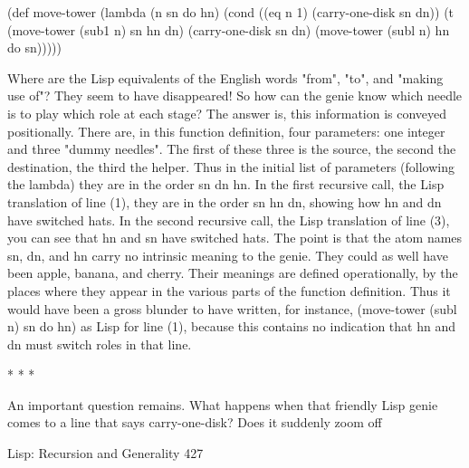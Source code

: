 (def move-tower (lambda (n sn do hn)
      (cond ((eq n 1) (carry-one-disk sn dn))
             (t (move-tower (sub1 n) sn hn dn)
                    (carry-one-disk sn dn)
                    (move-tower (subl n) hn do sn)))))

        Where are the Lisp equivalents of the English words "from", "to", and
"making use of"? They seem to have disappeared! So how can the genie know which
needle is to play which role at each stage? The answer is, this information is conveyed
positionally. There are, in this function definition, four parameters: one integer and
three "dummy needles". The first of these three is the source, the second the
destination, the third the helper. Thus in the initial list of parameters (following the
lambda) they are in the order sn dn hn. In the first recursive call, the Lisp translation
of line (1), they are in the order sn hn dn, showing how hn and dn have switched
hats. In the second recursive call, the Lisp translation of line (3), you can see that hn
and sn have switched hats.
        The point is that the atom names sn, dn, and hn carry no intrinsic meaning to
the genie. They could as well have been apple, banana, and cherry. Their meanings
are defined operationally, by the places where they appear in the various parts of the
function definition. Thus it would have been a gross blunder to have written, for
instance, (move-tower (subl n) sn do hn) as Lisp for line (1), because this contains
no indication that hn and dn must switch roles in that line.

                                       *   *   *

An important question remains. What happens when that friendly Lisp genie comes to
a line that says carry-one-disk? Does it suddenly zoom off




Lisp: Recursion and Generality                                                       427

